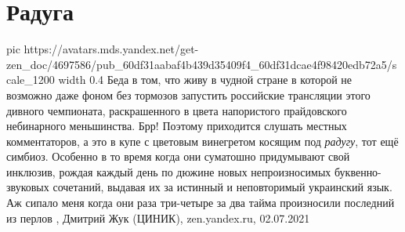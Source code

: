  
 
 
 
 
\chapter{Радуга}
\label{sec:slova.raduga}

\ifcmt
  pic https://avatars.mds.yandex.net/get-zen_doc/4697586/pub_60df31aabaf4b439d35409f4_60df31dcae4f98420edb72a5/scale_1200
	width 0.4
\fi
Беда в том, что живу в чудной стране в которой не возможно даже фоном без
тормозов запустить российские трансляции этого дивного чемпионата,
раскрашенного в цвета напористого прайдовского небинарного меньшинства. Брр!
Поэтому приходится слушать местных комментаторов, а это в купе с цветовым
винегретом косящим под \emph{радугу}, тот ещё симбиоз. Особенно в то время когда они
суматошно придумывают свой инклюзив, рождая каждый день по дюжине новых
непроизносимых буквенно-звуковых сочетаний, выдавая их за истинный и
неповторимый украинский язык. Аж сипало меня когда они раза три-четыре за два
тайма произносили последний из перлов
, Дмитрий Жук (ЦИНИК), zen.yandex.ru, 02.07.2021
